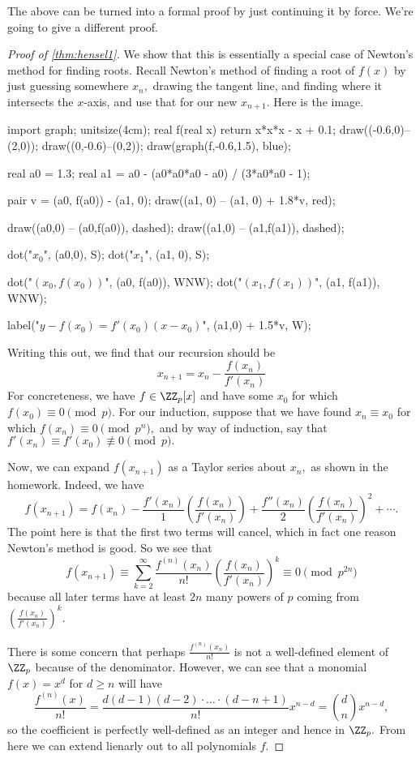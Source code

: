 \documentclass[../notes.tex]{subfiles}
\begin{document}
The above can be turned into a formal proof by just continuing it by force. We're going to give a different proof.
\begin{proof}[Proof of \autoref{thm:hensel1}]
	We show that this is essentially a special case of Newton's method for finding roots. Recall Newton's method of finding a root of $f(x)$ by just guessing somewhere $x_n,$ drawing the tangent line, and finding where it intersects the $x$-axis, and use that for our new $x_{n+1}.$ Here is the image.
	\begin{center}
		\begin{asy}
			import graph;
			unitsize(4cm);
			real f(real x)
			{
				return x*x*x - x + 0.1;
			}
			draw((-0.6,0)--(2,0)); draw((0,-0.6)--(0,2));
			draw(graph(f,-0.6,1.5), blue);

			real a0 = 1.3;
			real a1 = a0 - (a0*a0*a0 - a0) / (3*a0*a0 - 1);

			pair v = (a0, f(a0)) - (a1, 0);
			draw((a1, 0) -- (a1, 0) + 1.8*v, red);

			draw((a0,0) -- (a0,f(a0)), dashed);
			draw((a1,0) -- (a1,f(a1)), dashed);

			dot("$x_0$", (a0,0), S); dot("$x_1$", (a1, 0), S);

			dot("$(x_0,f(x_0))$", (a0, f(a0)), WNW);
			dot("$(x_{1},f(x_{1}))$", (a1, f(a1)), WNW);

			label("\color{red}$y-f(x_0)=f'(x_0)(x-x_0)$", (a1,0) + 1.5*v, W);
		\end{asy}
	\end{center}
	Writing this out, we find that our recursion should be
	\[x_{n+1}=x_n-\frac{f(x_n)}{f'(x_n)}\]
	For concreteness, we have $f\in\ZZ_p[x]$ and have some $x_0$ for which $f(x_0)\equiv0\pmod p.$ For our induction, suppose that we have found $x_n\equiv x_0$ for which $f(x_n)\equiv0\pmod{p^n},$ and by way of induction, say that $f'(x_n)\equiv f'(x_0)\not\equiv0\pmod p.$

	Now, we can expand $f(x_{n+1})$ as a Taylor series about $x_n,$ as shown in the homework. Indeed, we have
	\[f(x_{n+1})=f(x_n)-\frac{f'(x_n)}1\left(\frac{f(x_n)}{f'(x_n)}\right)+\frac{f''(x_n)}2\left(\frac{f(x_n)}{f'(x_n)}\right)^2+\cdots.\]
	The point here is that the first two terms will cancel, which in fact one reason Newton's method is good. So we see that
	\[f(x_{n+1})\equiv\sum_{k=2}^\infty\frac{f^{(n)}(x_n)}{n!}\left(\frac{f(x_n)}{f'(x_n)}\right)^k\equiv0\pmod{p^{2n}}\]
	because all later terms have at least $2n$ many powers of $p$ coming from $\left(\frac{f(x_n)}{f'(x_n)}\right)^k.$
	
	There is some concern that perhaps $\frac{f^{(n)}(x_n)}{n!}$ is not a well-defined element of $\ZZ_p$ because of the denominator. However, we can see that a monomial $f(x)=x^d$ for $d\ge n$ will have
	\[\frac{f^{(n)}(x)}{n!}=\frac{d(d-1)(d-2)\cdot\ldots\cdot(d-n+1)}{n!}x^{n-d}=\binom dnx^{n-d},\]
	so the coefficient is perfectly well-defined as an integer and hence in $\ZZ_p.$ From here we can extend lienarly out to all polynomials $f.$
\end{proof}
\end{document}
